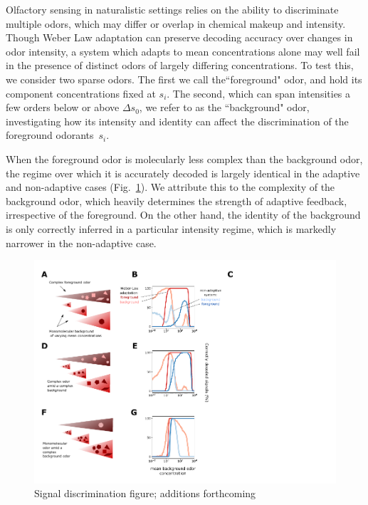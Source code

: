 Olfactory sensing in naturalistic settings relies on the ability to discriminate multiple odors, which may differ or overlap in chemical makeup and intensity. Though Weber Law adaptation can preserve decoding accuracy over changes in odor intensity, a system which adapts to mean concentrations alone may well fail in the presence of distinct odors of largely differing concentrations. To test this, we consider two sparse odors. The first we call the``foreground" odor, and hold its component concentrations fixed at $s_i$. The second, which can span intensities a few orders below or above $\Delta s_0$, we refer to as the ``background" odor, investigating how its intensity and identity can affect the discrimination of the foreground odorants~$s_i$. 

When the foreground odor is molecularly less complex than the background odor, the regime over which it is accurately decoded is largely identical in the adaptive and non-adaptive cases (Fig.~\ref{fig:signal_discrimination}). We attribute this to the complexity of the background odor, which heavily determines the strength of adaptive feedback, irrespective of the foreground. On the other hand, the identity of the background is only correctly inferred in a particular intensity regime, which is markedly narrower in the non-adaptive case.






\begin{figure}
	\includegraphics[width=\textwidth]{figures/Figures_signal_discrimination_weber_law}
	\caption{Signal discrimination figure; {\color {blue} additions forthcoming}}
	\label{fig:signal_discrimination}
\end{figure}

